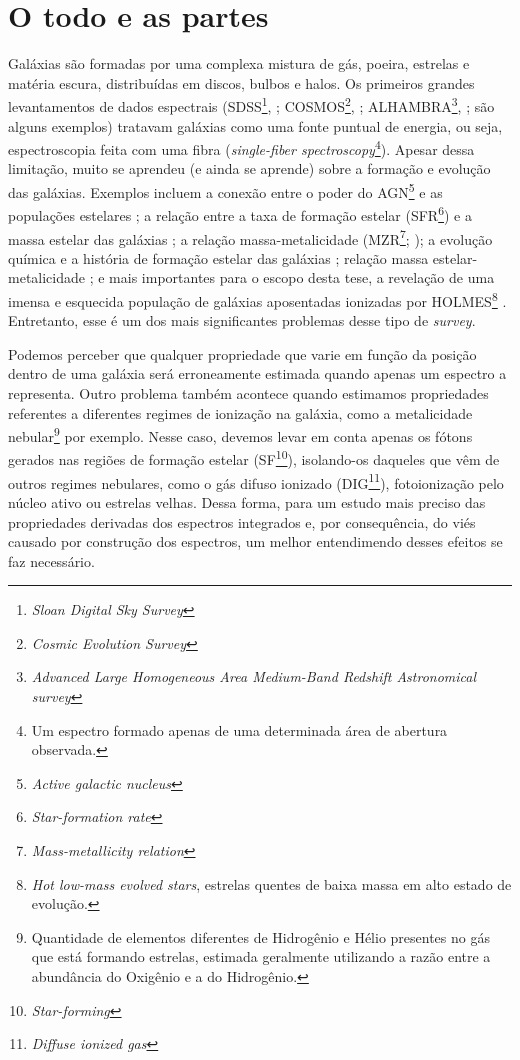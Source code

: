 \section{O todo e as partes}
\label{sec:intro:partes}

Galáxias são formadas por uma complexa mistura de gás, poeira, estrelas e matéria escura, distribuídas em discos, bulbos e halos. Os primeiros grandes levantamentos de dados espectrais (SDSS\footnote{\em Sloan Digital Sky Survey}, \citealt{York.etal.2000a}; COSMOS\footnote{\em Cosmic Evolution Survey}, \citealt{Scoville.etal.2007}; ALHAMBRA\footnote{\em Advanced Large Homogeneous Area Medium-Band Redshift Astronomical survey}, \citealt{Moles.etal.2008}; são alguns exemplos) tratavam galáxias como uma fonte puntual de energia, ou seja, espectroscopia feita com uma fibra ({\em single-fiber spectroscopy}\footnote{Um espectro formado apenas de uma determinada área de abertura observada.}). Apesar dessa limitação, muito se aprendeu (e ainda se aprende) sobre a formação e evolução das galáxias. Exemplos incluem a conexão entre o poder do AGN\footnote{\em Active galactic nucleus} e as populações estelares \citep{Kauffmann.etal.2003a}; a relação entre a taxa de formação estelar (SFR\footnote{\em Star-formation rate}) e a massa estelar das galáxias \citep{Brinchmann.etal.2004a}; a relação massa-metalicidade (MZR\footnote{\em Mass-metallicity relation}; \citealt{Tremonti.etal.2004a}); a evolução química e a história de formação estelar das galáxias \citep{CidFernandes.etal.2007, Asari.etal.2007a}; relação massa estelar-metalicidade \citep{ValeAsari.etal.2009a}; e mais importantes para o escopo desta tese, a revelação de uma imensa e esquecida população de galáxias aposentadas ionizadas por HOLMES\footnote{{\em Hot low-mass evolved stars}, estrelas quentes de baixa massa em alto estado de evolução.} \citep{Stasinska.etal.2008a, CidFernandes.etal.2010a, CidFernandes.etal.2011a}. Entretanto, esse é um dos mais significantes problemas desse tipo de {\em survey}.

Podemos perceber que qualquer propriedade que varie em função da posição dentro de uma galáxia será erroneamente estimada quando apenas um espectro a representa. Outro problema também acontece quando estimamos propriedades referentes a diferentes regimes de ionização na galáxia, como a metalicidade nebular\footnote{Quantidade de elementos diferentes de Hidrogênio e Hélio presentes no gás que está formando estrelas, estimada geralmente utilizando a razão entre a abundância do Oxigênio e a do Hidrogênio.} por exemplo. Nesse caso, devemos levar em conta apenas os fótons gerados nas regiões de formação estelar (SF\footnote{{\em Star-forming}}), isolando-os daqueles que vêm de outros regimes nebulares, como o gás difuso ionizado (DIG\footnote{{\em Diffuse ionized gas}}), fotoionização pelo núcleo ativo ou estrelas velhas. Dessa forma, para um estudo mais preciso das propriedades derivadas dos espectros integrados e, por consequência, do viés causado por construção dos espectros, um melhor entendimendo desses efeitos se faz necessário.

